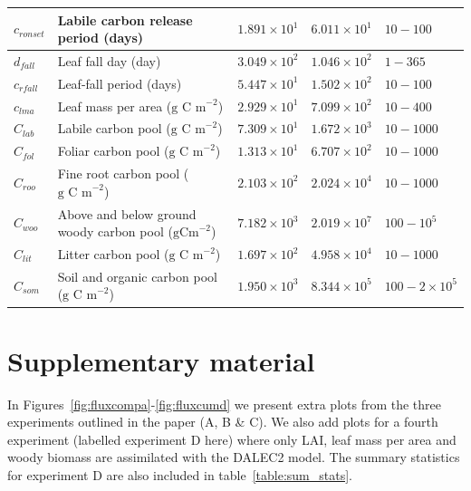 \begin{table}[ht]
\begin{center}
\begin{tabular}{| l | p{4.5cm} | p{1.7cm} | p{1.7cm} | p{1.7cm} |}
$c_{ronset}$ & Labile carbon release period (days) & $1.891\times 10^{1}$ & $6.011\times 10^{1}$ & $10 - 100$ \\ \hline
$d_{fall}$ & Leaf fall day (day) & $3.049\times 10^{2}$ & $1.046\times 10^{2}$ & $1 - 365$ \\ \hline
$c_{rfall}$ & Leaf-fall period (days) & $5.447\times 10^{1}$ & $1.502\times 10^{2}$ & $10 - 100$ \\ \hline
$c_{lma}$ & Leaf mass per area ($\text{g C m}^{-2}$) & $2.929\times 10^{1}$ & $7.099\times 10^{2}$ & $10 - 400$ \\ \hline
$C_{lab}$ & Labile carbon pool ($\text{g C m}^{-2}$) & $7.309\times 10^{1}$ & $1.672\times 10^{3}$ & $10 - 1000$ \\ \hline
$C_{fol}$ & Foliar carbon pool ($\text{g C m}^{-2}$) & $1.313\times 10^{1}$ & $6.707\times 10^{2}$ & $10 - 1000$ \\ \hline
$C_{roo}$ & Fine root carbon pool ($\text{g C m}^{-2}$) & $2.103\times 10^{2}$ & $2.024\times 10^{4}$ & $10 - 1000$ \\ \hline
$C_{woo}$ & Above and below ground woody carbon pool ($\text{gCm}^{-2}$) & $7.182\times 10^{3}$ & $2.019\times 10^{7}$ & $100 - 10^{5}$ \\ \hline
$C_{lit}$ & Litter carbon pool ($\text{g C m}^{-2}$) & $1.697\times 10^{2}$ & $4.958\times 10^{4}$ & $10 - 1000$ \\ \hline
$C_{som}$ & Soil and organic carbon pool ($\text{g C m}^{-2}$) & $1.950\times 10^{3}$ & $8.344\times 10^{5}$ & $100 - 2 \times 10^{5}$  \\ \hline
	\end{tabular}
	\label{table:xbvars}
\end{center} 
\end{table}


\section{Supplementary material}


In Figures~\ref{fig:fluxcompa}-\ref{fig:fluxcumd} we present extra plots from the three experiments outlined in the paper (A, B \& C). We also add plots for a fourth experiment (labelled experiment D here) where only LAI, leaf mass per area and woody biomass are assimilated with the DALEC2 model. The summary statistics for experiment D are also included in table~\ref{table:sum_stats}.

